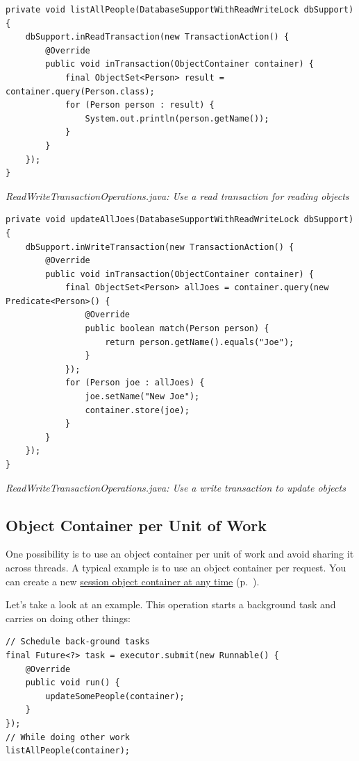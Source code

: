 \begin{lstlisting}
private void listAllPeople(DatabaseSupportWithReadWriteLock dbSupport) {
    dbSupport.inReadTransaction(new TransactionAction() {
        @Override
        public void inTransaction(ObjectContainer container) {
            final ObjectSet<Person> result = container.query(Person.class);
            for (Person person : result) {
                System.out.println(person.getName());
            }
        }
    });
}
\end{lstlisting}

{\small\itshape ReadWriteTransactionOperations.java: Use a read transaction for reading objects\par}
\medskip

\begin{lstlisting}
private void updateAllJoes(DatabaseSupportWithReadWriteLock dbSupport) {
    dbSupport.inWriteTransaction(new TransactionAction() {
        @Override
        public void inTransaction(ObjectContainer container) {
            final ObjectSet<Person> allJoes = container.query(new Predicate<Person>() {
                @Override
                public boolean match(Person person) {
                    return person.getName().equals("Joe");
                }
            });
            for (Person joe : allJoes) {
                joe.setName("New Joe");
                container.store(joe);
            }
        }
    });
}
\end{lstlisting}

{\small\itshape ReadWriteTransactionOperations.java: Use a write transaction to update objects\par}
\medskip

\subsection{Object Container per Unit of Work}
\label{ref:advanced-topics-concurrency-object-container-per-unit-of-work}

One possibility is to use an object container per unit of work and avoid sharing it across threads. A typical example is to use an object container per request. You can create a new \hyperref[ref:advanced-topics-session-containers]{session object container at any time} (p.~\pageref{ref:advanced-topics-session-containers}).

Let's take a look at an example. This operation starts a background task and carries on doing other things:

\begin{lstlisting}
// Schedule back-ground tasks
final Future<?> task = executor.submit(new Runnable() {
    @Override
    public void run() {
        updateSomePeople(container);
    }
});
// While doing other work
listAllPeople(container);
\end{lstlisting}

